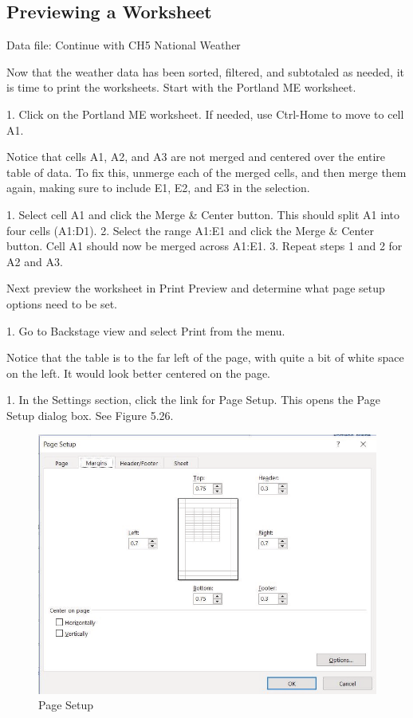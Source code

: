 \subsection{Previewing a Worksheet}

Data file: Continue with CH5 National Weather

Now that the weather data has been sorted, filtered, and subtotaled as needed, it is time to print the
worksheets. Start with the Portland ME worksheet.

1. Click on the Portland ME worksheet. If needed, use Ctrl-Home to move to cell A1.

Notice that cells A1, A2, and A3 are not merged and centered over the entire table of data. To fix this, unmerge each of the merged cells, and then merge them again, making sure to include E1, E2, and E3 in the selection.

1. Select cell A1 and click the Merge \& Center button. This should split A1 into four cells (A1:D1).
2. Select the range A1:E1 and click the Merge \& Center button. Cell A1 should now be merged
across A1:E1.
3. Repeat steps 1 and 2 for A2 and A3.

Next preview the worksheet in Print Preview and determine what page setup options need to be set.

1. Go to Backstage view and select Print from the menu.

Notice that the table is to the far left of the page, with quite a bit of white space on the left. It would look better centered on the page.

1. In the Settings section, click the link for Page Setup. This opens the Page Setup dialog box. See
Figure 5.26.


\begin{figure}[H]
	\centering
	\includegraphics[width=\maxwidth{.95\linewidth}]{gfx/ch05_fig26}
	\caption{Page Setup}
	\label{05:fig26}
\end{figure}





